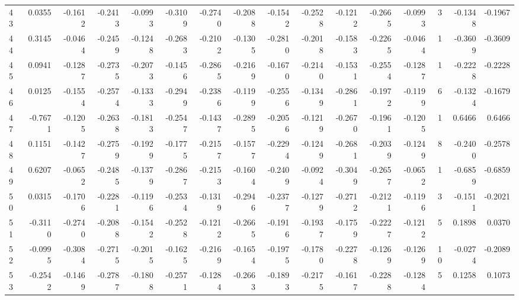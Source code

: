 \begin{tabular}{lrrrrrrrrrrrrrrr}
43  &      0.0355 & -0.1612 & -0.2413 & -0.0993 & -0.3109 & -0.2740 & -0.2088 & -0.1542 & -0.2528 & -0.1212 &  -0.2665 &    -0.0993 &      3 &                   -0.1348 &                    -0.1967 \\
44  &      0.3145 & -0.0464 & -0.2459 & -0.1248 & -0.2683 & -0.2102 & -0.1305 & -0.2810 & -0.2018 & -0.1583 &  -0.2265 &    -0.0464 &      1 &                   -0.3609 &                    -0.3609 \\
45  &      0.0941 & -0.1287 & -0.2735 & -0.2073 & -0.1456 & -0.2865 & -0.2169 & -0.1670 & -0.2140 & -0.1531 &  -0.2554 &    -0.1287 &      1 &                   -0.2228 &                    -0.2228 \\
46  &      0.0125 & -0.1554 & -0.2574 & -0.1333 & -0.2949 & -0.2386 & -0.1199 & -0.2556 & -0.1349 & -0.2861 &  -0.1972 &    -0.1199 &      6 &                   -0.1324 &                    -0.1679 \\
47  &     -0.7671 & -0.1205 & -0.2638 & -0.1813 & -0.2547 & -0.1437 & -0.2895 & -0.2056 & -0.1219 & -0.2670 &  -0.1961 &    -0.1205 &      1 &                    0.6466 &                     0.6466 \\
48  &      0.1151 & -0.1427 & -0.2759 & -0.1929 & -0.1775 & -0.2157 & -0.1577 & -0.2294 & -0.1249 & -0.2681 &  -0.2039 &    -0.1249 &      8 &                   -0.2400 &                    -0.2578 \\
49  &      0.6207 & -0.0652 & -0.2485 & -0.1379 & -0.2867 & -0.2153 & -0.1604 & -0.2409 & -0.0924 & -0.3049 &  -0.2657 &    -0.0652 &      1 &                   -0.6859 &                    -0.6859 \\
50  &      0.0315 & -0.1706 & -0.2281 & -0.1196 & -0.2534 & -0.1319 & -0.2946 & -0.2377 & -0.1279 & -0.2712 &  -0.2121 &    -0.1196 &      3 &                   -0.1511 &                    -0.2021 \\
51  &     -0.3110 & -0.2740 & -0.2088 & -0.1542 & -0.2528 & -0.1212 & -0.2665 & -0.1916 & -0.1937 & -0.1759 &  -0.2227 &    -0.1212 &      5 &                    0.1898 &                     0.0370 \\
52  &     -0.0995 & -0.3084 & -0.2715 & -0.2015 & -0.1625 & -0.2169 & -0.1654 & -0.1975 & -0.1780 & -0.2278 &  -0.1269 &    -0.1269 &     10 &                   -0.0274 &                    -0.2089 \\
53  &     -0.2542 & -0.1469 & -0.2787 & -0.1808 & -0.2571 & -0.1284 & -0.2663 & -0.1893 & -0.2175 & -0.1617 &  -0.2288 &    -0.1284 &      5 &                    0.1258 &                     0.1073 \\

\end{tabular}
